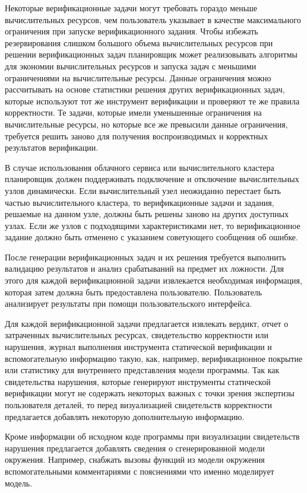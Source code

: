 \documentclass[%
candidate,     %
href,        %
colorlinks,  %
]{disser}
\begin{document}
Некоторые верификационные задачи могут требовать гораздо меньше вычислительных ресурсов, чем пользователь указывает в качестве максимального ограничения при запуске верификационного задания.
Чтобы избежать резервирования слишком большого объема вычислительных ресурсов при решении верификационных задач планировщик может реализовывать алгоритмы для экономии вычислительных ресурсов и запуска задач с меньшими ограничениями на вычислительные ресурсы.
Данные ограничения можно рассчитывать на основе статистики решения других верификационных задач, которые используют тот же инструмент верификации и проверяют те же правила корректности.
Те задачи, которые имели уменьшенные ограничения на вычислительные ресурсы, но которые все же превысили данные ограничения, требуется решить заново для получения воспроизводимых и корректных результатов верификации.

В случае использования облачного сервиса или вычислительного кластера планировщик должен поддерживать подключение и отключение вычислительных узлов динамически.
Если вычислительный узел неожиданно перестает быть частью вычислительного кластера, то верификационные задачи и задания, решаемые на данном узле, должны быть решены заново на других доступных узлах.
Если же узлов с подходящими характеристиками нет, то верификационное задание должно быть отменено с указанием советующего сообщения об ошибке.

После генерации верификационных задач и их решения требуется выполнить валидацию результатов и анализ срабатываний на предмет их ложности.
Для этого для каждой верификационной задачи извлекается необходимая информация, которая затем должна быть предоставлена пользователю.
Пользователь анализирует результаты при помощи пользовательского интерфейса.

Для каждой верификационной задачи предлагается извлекать вердикт, отчет о затраченных вычислительных ресурсах, свидетельство корректности или нарушения, журнал выполнения инструмента статической верификации и вспомогательную информацию такую, как, например, верификационное покрытие или статистику для внутреннего представления модели программы.
Так как свидетельства нарушения, которые генерируют инструменты статической верификации могут не содержать некоторых важных с точки зрения экспертизы пользователя деталей, то перед визуализацией свидетельств корректности предлагается добавлять некоторую дополнительную информацию.

Кроме информации об исходном коде программы при визуализации свидетельств нарушения предлагается добавлять сведения о сгенерированной модели окружения.
Например, снабжать вызовы функций из модели окружения вспомогательными комментариями с пояснениями что именно моделирует модель.
\end{document}
